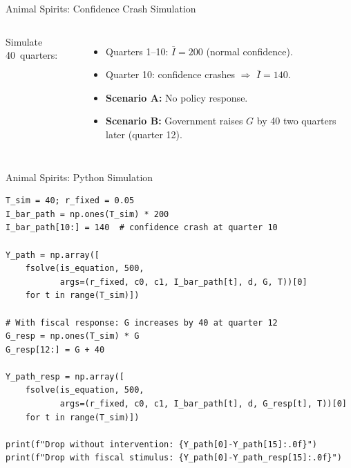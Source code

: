 \documentclass[aspectratio=169, 10pt]{beamer}
\begin{document}
\begin{frame}{Animal Spirits: Confidence Crash Simulation}
\begin{columns}[T]
Simulate 40~quarters:
\begin{itemize}
  \item Quarters 1--10: $\bar{I} = 200$ (normal confidence).
  \item Quarter 10: confidence crashes $\Rightarrow$ $\bar{I} = 140$.
  \item \textbf{Scenario A:} No policy response.
  \item \textbf{Scenario B:} Government raises $G$ by 40
        two quarters later (quarter 12).
\end{itemize}
\begin{center}
\end{center}
\end{columns}
\end{frame}

\begin{frame}[fragile]{Animal Spirits: Python Simulation}
\begin{lstlisting}
T_sim = 40; r_fixed = 0.05
I_bar_path = np.ones(T_sim) * 200
I_bar_path[10:] = 140  # confidence crash at quarter 10

Y_path = np.array([
    fsolve(is_equation, 500,
           args=(r_fixed, c0, c1, I_bar_path[t], d, G, T))[0]
    for t in range(T_sim)])

# With fiscal response: G increases by 40 at quarter 12
G_resp = np.ones(T_sim) * G
G_resp[12:] = G + 40

Y_path_resp = np.array([
    fsolve(is_equation, 500,
           args=(r_fixed, c0, c1, I_bar_path[t], d, G_resp[t], T))[0]
    for t in range(T_sim)])

print(f"Drop without intervention: {Y_path[0]-Y_path[15]:.0f}")
print(f"Drop with fiscal stimulus: {Y_path[0]-Y_path_resp[15]:.0f}")
\end{lstlisting}
\end{frame}
\end{document}
